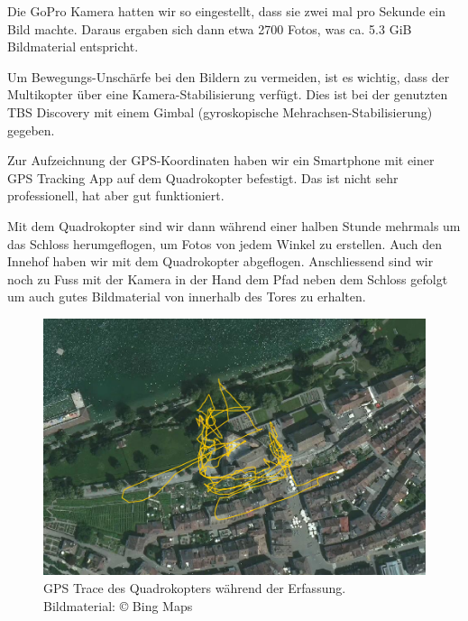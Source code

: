 Die GoPro Kamera hatten wir so eingestellt, dass sie zwei mal pro Sekunde ein
Bild machte. Daraus ergaben sich dann etwa 2700 Fotos, was ca. 5.3 GiB
Bildmaterial entspricht.

Um Bewegungs-Unschärfe bei den Bildern zu vermeiden, ist es wichtig, dass der
Multikopter über eine Kamera-Stabilisierung verfügt. Dies ist bei der genutzten
TBS Discovery mit einem Gimbal (gyroskopische Mehrachsen-Stabilisierung)
gegeben.

Zur Aufzeichnung der GPS-Koordinaten haben wir ein Smartphone mit einer GPS
Tracking App auf dem Quadrokopter befestigt. Das ist nicht sehr professionell,
hat aber gut funktioniert.

Mit dem Quadrokopter sind wir dann während einer halben Stunde mehrmals um das
Schloss herumgeflogen, um Fotos von jedem Winkel zu erstellen. Auch den Innehof
haben wir mit dem Quadrokopter abgeflogen. Anschliessend sind wir noch zu Fuss
mit der Kamera in der Hand dem Pfad neben dem Schloss gefolgt um auch gutes
Bildmaterial von innerhalb des Tores zu erhalten.

\vspace{1\baselineskip}

\begin{figure}[H]
	\centering
	\includegraphics[width=\textwidth]{images/gpstrace_satellite.png}
	\caption{GPS Trace des Quadrokopters während der Erfassung.\\Bildmaterial:
		\copyright{} Bing Maps}
	\label{img:gpstrace-satellite}
\end{figure}

